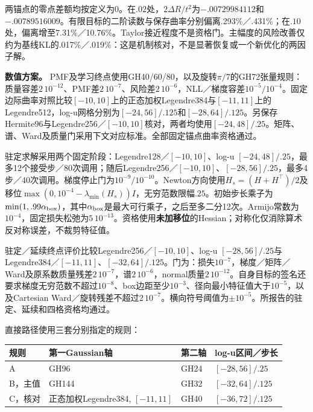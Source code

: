 \documentclass[11pt,a4paper]{article}
\begin{document}
两锚点的零点差额均按定义为0。在\(.02\)处，\(2\Delta R/t^2\)为\(−.00729984112\)和\(−.00789516009\)。有限目标的二阶读数与保存曲率分别偏离.293\%／.431\%；在\(.10\)处，偏离增至7.31\%／10.76\%。Taylor接近程度不是资格门。主幅度的风险改善仅约为基线KL的.017\%／.019\%：这是机制核对，不是显著恢复或一个新优化的两因子解。

\textbf{数值方案。}
PMF及学习终点使用GH40/60/80，以及旋转\(\pi/7\)的GH72张量规则：质量容差\(2\,10^{-12}\)、PMF差\(2\,10^{-7}\)、风险差\(2\,10^{-6}\)，NLL／梯度容差\(10^{-5}/10^{-4}\)。固定边际曲率对照比较\([-10,10]\)上的正态加权Legendre384与\([-11,11]\)上的Legendre512，log-u网格分别为\([-24,56]/.125\)和\([-28,64]/.125\)。另保存Hermite96与Legendre256／\([-10,10]\)核对，两者均使用\([-24,48]/.25\)。矩阵、谱、Ward及质量门采用下文对应标准。全部固定锚点曲率资格通过。

驻定求解采用两个固定阶段：Legendre128／\([-10,10]\)、log-u
\([-24,48]/.25\)，最多12个接受步／80次调用；随后Legendre256／\([-10,10]\)、\([-28,56]/.25\)，最多4步／40次调用。梯度停止门为\(10^{-9}/10^{-10}\)。Newton方向使用\(H_s=(H+H^\top)/2\)及移位\(\max(0,10^{-4}-\lambda_{\min}(H_s))I\)，无穷范数限幅\(.25\)。初始步长乘子为\(\min(1,.99\alpha_{\rm box})\)，其中\(\alpha_{\rm box}\)是最大可行乘子，之后至多二分12次。Armijo常数为\(10^{-4}\)，固定损失松弛为\(5\,10^{-13}\)。资格使用\textbf{未加移位}的Hessian；对称化仅消除算术反对称误差，不裁剪特征值。

驻定／延续终点评价比较Legendre256／\([-10,10]\)、log-u
\([-28,56]/.25\)与Legendre384／\([-11,11]\)、\([-32,64]/.125\)。门为：损失\(10^{-7}\)，梯度／矩阵／Ward及原系数质量残差\(2\,10^{-7}\)，谱\(2\,10^{-6}\)，normal质量\(2\,10^{-12}\)。自身目标的签名还要求梯度无穷范数不超过\(10^{-8}\)、box边距至少\(10^{-3}\)、径向最小特征值大于\(10^{-5}\)，以及Cartesian
Ward／旋转残差不超过\(2\,10^{-7}\)。横向符号阈值为\(\pm10^{-5}\)。所报告的驻定、延续和四格资格均通过。

直接路径使用三套分别指定的规则：

\begin{longtable}[]{@{}llll@{}}
\toprule\noalign{}
规则 & 第一Gaussian轴 & 第二轴 & log-u区间／步长 \\
\midrule\noalign{}
\endhead
\bottomrule\noalign{}
\endlastfoot
A & GH96 & GH24 & \([-28,56]/.25\) \\
B，主值 & GH144 & GH32 & \([-32,64]/.125\) \\
C，核对 & 正态加权Legendre384, \([-11,11]\) & GH40 &
\([-36,72]/.125\) \\
\end{longtable}
\end{document}
